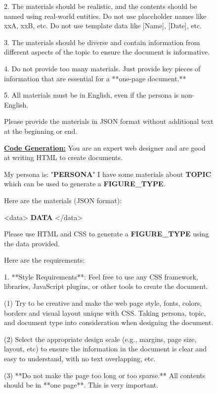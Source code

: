 \begin{figure}[!ht]
\begin{center}
\begin{tcolorbox} [top=3pt,bottom=3pt, left=3pt, right=3pt, width=\linewidth, boxrule=1pt]
{{2. The materials should be realistic, and the contents should be named using real-world entities. Do not use placeholder names like xxA, xxB, etc. Do not use template data like [Name], [Date], etc.

3. The materials should be diverse and contain information from different aspects of the topic to ensure the document is informative.

4. Do not provide too many materials. Just provide key pieces of information that are essential for a **one-page document.**

5. All materials must be in English, even if the persona is non-English.

Please provide the materials in JSON format without additional text at the beginning or end.}    \par}
    \end{tcolorbox}

\begin{tcolorbox} [top=3pt,bottom=3pt, left=3pt, right=3pt, width=\linewidth, boxrule=1pt]
    {\scriptsize {\selectfont    
    \underline{\textbf{Code Generation:}}
    You are an expert web designer and are good at writing HTML to create documents.
    
My persona is: "\textbf{PERSONA}"
I have some materials about \textbf{TOPIC} which can be used to generate a \textbf{FIGURE\_TYPE}.

Here are the materials (JSON format):

<data>
\textbf{DATA}
</data>

Please use HTML and CSS to generate a \textbf{FIGURE\_TYPE} using the data provided. 

Here are the requirements:

1. **Style Requirements**: Feel free to use any CSS framework, libraries, JavaScript plugins, or other tools to create the document.

    (1) Try to be creative and make the web page style, fonts, colors, borders and visual layout unique with CSS. Taking persona, topic, and document type into consideration when designing the document.
    
    (2) Select the appropriate design scale (e.g., margins, page size, layout, etc) to ensure the information in the document is clear and easy to understand, with no text overlapping, etc.
    
    (3) **Do not make the page too long or too sparse.** All contents should be in **one page**. This is very important.
    
}}
\end{tcolorbox}
\end{center}
\end{figure}
